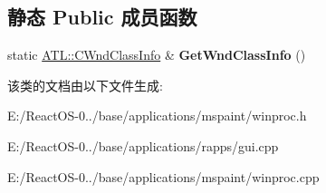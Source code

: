 \subsection*{静态 Public 成员函数}
\begin{DoxyCompactItemize}
\item 
\mbox{\label{class_c_main_window_a54dfe82724410eeb567587b83b6811e2}} 
static \hyperlink{struct_a_t_l_1_1___a_t_l___w_n_d_c_l_a_s_s_i_n_f_o_w}{A\+T\+L\+::\+C\+Wnd\+Class\+Info} \& {\bfseries Get\+Wnd\+Class\+Info} ()
\end{DoxyCompactItemize}


该类的文档由以下文件生成\+:\begin{DoxyCompactItemize}
\item 
E\+:/\+React\+O\+S-\/0../base/applications/mspaint/winproc.\+h\item 
E\+:/\+React\+O\+S-\/0../base/applications/rapps/gui.\+cpp\item 
E\+:/\+React\+O\+S-\/0../base/applications/mspaint/winproc.\+cpp\end{DoxyCompactItemize}
